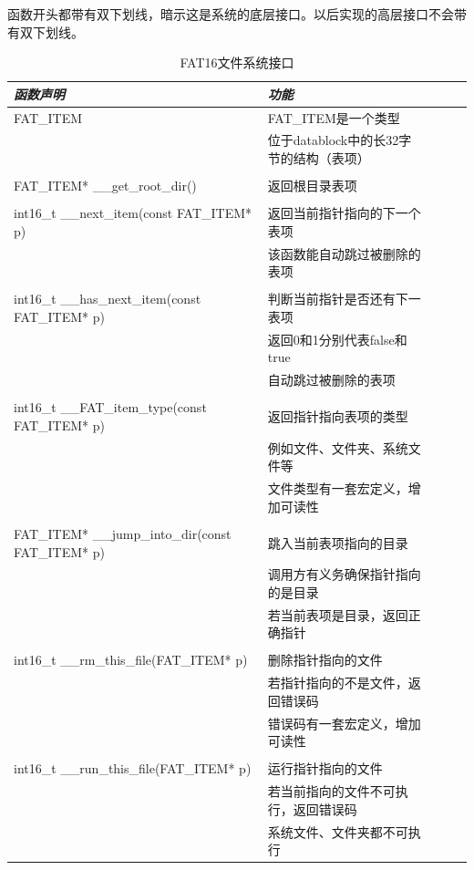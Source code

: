 \documentclass[a4paper]{article}
\begin{document}
    函数开头都带有双下划线，暗示这是系统的底层接口。以后实现的高层接口不会带有双下划线。
    \begin{table}[!htb]
    \caption{FAT16文件系统接口 }\label{tab:fatAPI}
    \begin{tabular}{@{} *5l @{}}
        \toprule
    \emph{函数声明} & \emph{功能} &&& \\
        \midrule
        FAT\_ITEM & FAT\_ITEM是一个类型
            \\& 位于datablock中的长32字节的结构（表项）\\
        \\
        FAT\_ITEM* \_\_get\_root\_dir() & 返回根目录表项 \\
        \\
        int16\_t \_\_next\_item(const FAT\_ITEM* p) 
            & 返回当前指针指向的下一个表项
            \\& 该函数能自动跳过被删除的表项 \\
        \\
        int16\_t \_\_has\_next\_item(const FAT\_ITEM* p)
            & 判断当前指针是否还有下一表项
            \\& 返回0和1分别代表false和true
            \\& 自动跳过被删除的表项 \\
        \\
        int16\_t \_\_FAT\_item\_type(const FAT\_ITEM* p)
            & 返回指针指向表项的类型
            \\& 例如文件、文件夹、系统文件等
            \\& 文件类型有一套宏定义，增加可读性 \\
        \\
        FAT\_ITEM* \_\_jump\_into\_dir(const FAT\_ITEM* p)
            & 跳入当前表项指向的目录
            \\& 调用方有义务确保指针指向的是目录
            \\& 若当前表项是目录，返回正确指针\\
        \\ 
        int16\_t \_\_rm\_this\_file(FAT\_ITEM* p) 
            & 删除指针指向的文件 
            \\& 若指针指向的不是文件，返回错误码
            \\& 错误码有一套宏定义，增加可读性\\
        \\ 
        int16\_t \_\_run\_this\_file(FAT\_ITEM* p)
            & 运行指针指向的文件
            \\& 若当前指向的文件不可执行，返回错误码
            \\& 系统文件、文件夹都不可执行 \\
        \bottomrule
    \hline
    \end{tabular}
    \end{table}
\end{document}
